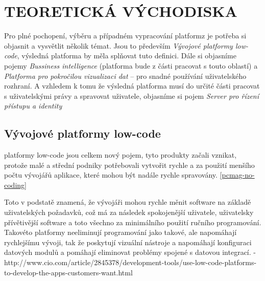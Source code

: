 \chapter{TEORETICKÁ VÝCHODISKA}
\par Pro plné pochopení, výběru a případném vypracování platformz je potřeba si objasnit a vysvětlit několik témat. Jsou to především \textit{Vývojové platformy low-code}, výsledná platforma by měla splňovat tuto definici. Dále si objasníme pojemy \textit{Bussiness intelligence} (platforma bude z části pracovat s touto oblastí) a \textit{Platforma pro pokročilou vizualizaci dat} -- pro snadné používání uživatelského rozhraní. A vzhledem k tomu že výsledná platforma musí do určité části pracovat s uživatelskými právy a spravovat uživatele, objasníme si pojem \textit{Server pro řízení přístupu a identity}

\section{Vývojové platformy low-code}
 platformy low-code jsou celkem nový pojem, tyto produkty začali vznikat, protože malé a střední podniky potřebovali vytvořit rychle a za použití menšího počtu vývojářů aplikace, které mohou být nadále rychle spravovány. \ref{pcmag-no-coding}

\par Toto v podstatě znamená, že vývojáři mohou rychle měnit software na základě uživatelských požadavků, což má za následek spokojenější uživatele, uživatelsky přívětivější software a toto všechno za minimálního použití ručního programování. Takovéto platformy neeliminují programování jako takové, ale napomáhají rychlejšímu vývoji, tak že poskytují vizuální nástroje a napomáhají konfiguraci datových modulů a pomáhají eliminovat problémy spojené s  datovou integrací. - http://www.cio.com/article/2845378/development-tools/use-low-code-platforms-to-develop-the-apps-customers-want.html

